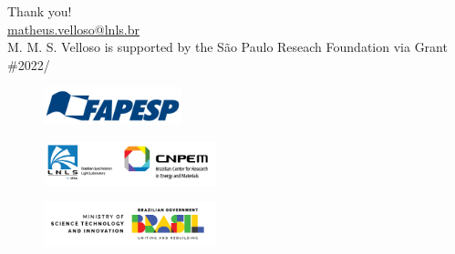 \documentclass[aspectratio=169]{beamer}
\begin{document}
\begin{frame}[plain]
    Thank you!\\
    \vfill
    \url{matheus.velloso@lnls.br}\\
    \vfill
    M. M. S. Velloso is supported by the São Paulo Reseach Foundation via Grant \#2022/
    \begin{figure}
        \centering
        \includegraphics[width=4cm]{fapesp.png}
    \end{figure}
    \begin{minipage}{0.49\textwidth}
        \begin{figure}
            \includegraphics[width=5cm]{cnpem_lnls.png}
        \end{figure}
    \end{minipage}
    \begin{minipage}{0.49\textwidth}
        \begin{figure}
            \includegraphics[width=5cm]{mcti.png}
        \end{figure}
    \end{minipage}
    \vfill
    
\end{frame}
\end{document}
